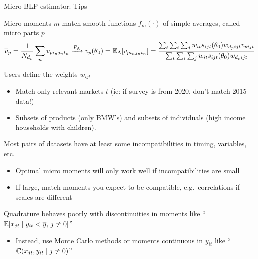 \begin{frame}[label=estimator]{Micro BLP estimator: Tips}
    \begin{wideitemize}
        \item Micro moments $m$ match smooth functions $f_m(\cdot)$ of simple averages, called micro parts $p$
        \begin{equation*}
            \overline{v}_p = \frac{1}{N_{d_p}} \sum_n v_{pi_nj_nt_n} \xrightarrow{P_\mathrm{A}} v_p(\theta_0) = \mathbb{E}_\mathrm{A}[v_{pi_nj_nt_n}] = \frac{\sum_t \sum_i \sum_j w_{it} s_{ijt}(\theta_0) w_{d_pijt} v_{pijt}}{\sum_t \sum_i \sum_j w_{it} s_{ijt}(\theta_0) w_{d_pijt}}
        \end{equation*}
        \item Users define the \alert{weights} $w_{ijt}$
        \begin{itemize}
            \item Match only relevant markets $t$ (ie: if survey is from 2020, don't match 2015 data!)
            \item Subsets of products (only BMW's) and subsets of individuals (high income households with children).
        \end{itemize}
        
        \item Most pairs of datasets have at least some  \alert{incompatibilities} in timing, variables, etc.
        \begin{itemize}
            \item Optimal micro moments will only work well if incompatibilities are small
            \item If large, match moments you expect to be compatible, e.g.\ correlations if scales are different
        \end{itemize}
    
        \item Quadrature behaves poorly with \alert{discontinuities} in moments like ``$\mathbb{E}[x_{jt} \mid y_{it} < \overline{y}, \, j \neq 0]$''
        \begin{itemize}
            \item Instead, use Monte Carlo methods or moments continuous in $y_{it}$ like ``$\mathbb{C}(x_{jt}, y_{it} \mid j \neq 0)$''
        \end{itemize}
    \end{wideitemize}
\end{frame}




